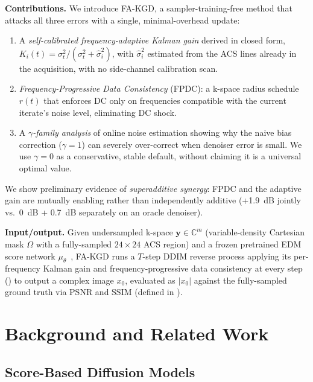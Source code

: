 \documentclass[10pt,twocolumn,letterpaper]{article}
\newcommand{\hatsig}{\hat{\sigma}}
\newcommand{\muth}{\mu_\theta}
\begin{document}
\textbf{Contributions.} We introduce FA-KGD, a sampler-training-free method that
attacks all three errors with a single, minimal-overhead update:
\begin{enumerate}
  \item A \emph{self-calibrated frequency-adaptive Kalman gain} derived in
  closed form, $K_i(t)=\sigma_t^2/(\sigma_t^2+\hatsig_i^2)$, with $\hatsig_i^2$
  estimated from the ACS lines already in the acquisition, with no side-channel
  calibration scan.
  \item \emph{Frequency-Progressive Data Consistency} (FPDC): a k-space
  radius schedule $r(t)$ that enforces DC only on frequencies compatible with
  the current iterate's noise level, eliminating DC shock.
  \item A \emph{$\gamma$-family analysis} of online noise estimation showing
  why the naive bias correction ($\gamma{=}1$) can severely over-correct when
  denoiser error is small. We use $\gamma{=}0$ as a conservative, stable
  default, without claiming it is a universal optimal value.
\end{enumerate}
We show preliminary evidence of \emph{superadditive synergy}: FPDC and the adaptive gain
are mutually enabling rather than independently additive (+1.9~dB jointly vs.~0~dB + 0.7~dB separately on an oracle denoiser).


\textbf{Input/output.} Given undersampled k-space
$\mathbf{y}\in\mathbb{C}^{m}$ (variable-density Cartesian mask $\Omega$ with a
fully-sampled $24{\times}24$ ACS region) and a frozen pretrained EDM score
network $\muth$~\cite{daras2025ambient}, FA-KGD runs a $T$-step DDIM reverse
process applying its per-frequency Kalman gain and frequency-progressive data
consistency at every step () to output a complex
image $x_0$, evaluated as $|x_0|$ against the fully-sampled ground truth via
PSNR and SSIM (defined in ).

\section{Background and Related Work}
\label{sec:related}

\subsection{Score-Based Diffusion Models}
\end{document}
